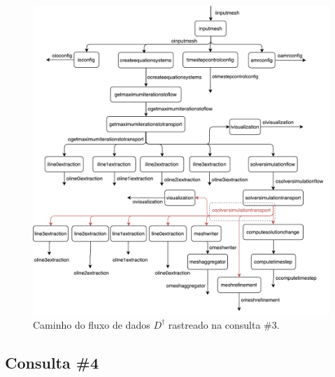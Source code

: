 \begin{figure}[htb]
    \centering
    \includegraphics[width=\textwidth]{img/experiments-dataflow-3}
    \caption[Caminho do fluxo de dados \(D^{\dagger}\) rastreado na consulta \#3]{Caminho do fluxo de dados \(D^{\dagger}\) rastreado na consulta \#3.}%
    \label{fig:experiments-dataflow-3}
\end{figure}

\subsection{Consulta \#4}


